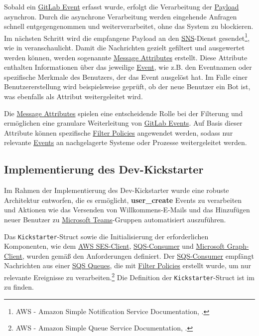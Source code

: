 Sobald ein \hyperlink{GitLabEvent}{\textcolor{AOBlau}{GitLab Event}} erfasst wurde, erfolgt die Verarbeitung der \hyperlink{Payload}{\textcolor{AOBlau}{Payload}} asynchron. Durch die asynchrone Verarbeitung werden eingehende Anfragen schnell entgegengenommen und weiterverarbeitet, ohne das System zu blockieren. Im nächsten Schritt wird die empfangene Payload an den \hyperlink{SNS}{\textcolor{AOBlau}{SNS}}-Dienst gesendet\footnote{AWS - Amazon Simple Notification Service Documentation, \cite{aws2023sns}.}, wie in  veranschaulicht. Damit die Nachrichten gezielt gefiltert und ausgewertet werden können, werden sogenannte \hyperlink{MessageAttributes}{\textcolor{AOBlau}{Message Attributes}} erstellt. Diese Attribute enthalten Informationen über das jeweilige \hyperlink{GitLabEvent}{\textcolor{AOBlau}{Event}}, wie z.B. den Eventnamen oder spezifische Merkmale des Benutzers, der das Event ausgelöst hat. Im Falle einer Benutzererstellung wird beispielsweise geprüft, ob der neue Benutzer ein Bot ist, was ebenfalls als Attribut weitergeleitet wird.

Die \hyperlink{MessageAttributes}{\textcolor{AOBlau}{Message Attributes}} spielen eine entscheidende Rolle bei der Filterung und ermöglichen eine granulare Weiterleitung von \hyperlink{GitLabEvent}{\textcolor{AOBlau}{GitLab Events}}. Auf Basis dieser Attribute können spezifische \hyperlink{FilterPolicies}{\textcolor{AOBlau}{Filter Policies}} angewendet werden, sodass nur relevante \hyperlink{Events}{\textcolor{AOBlau}{Events}} an nachgelagerte Systeme oder Prozesse weitergeleitet werden.

\subsection{Implementierung des Dev-Kickstarter}
\label{sec:ImplementierungBenutzeroberflaeche}

Im Rahmen der Implementierung des Dev-Kickstarter wurde eine robuste Architektur entworfen, die es ermöglicht, \textbf{user\_create} Events zu verarbeiten und Aktionen wie das Versenden von Willkommens-E-Mails und das Hinzufügen neuer Benutzer zu \hyperlink{MicrosoftTeams}{\textcolor{AOBlau}{Microsoft Teams}}-Gruppen automatisiert auszuführen.

Das \texttt{Kickstarter}-Struct sowie die Initialisierung der erforderlichen Komponenten, wie dem \hyperlink{AWSSESClient}{\textcolor{AOBlau}{AWS SES-Client}}, \hyperlink{SQSConsumer}{\textcolor{AOBlau}{SQS-Consumer}} und \hyperlink{GraphClient}{\textcolor{AOBlau}{Microsoft Graph-Client}}, wurden gemäß den Anforderungen definiert. Der \hyperlink{SQSConsumer}{\textcolor{AOBlau}{SQS-Consumer}} empfängt Nachrichten aus einer \hyperlink{SQS}{\textcolor{AOBlau}{SQS Queues}}, die mit \hyperlink{FilterPolicies}{\textcolor{AOBlau}{Filter Policies}} erstellt wurde, um nur relevante Ereignisse zu verarbeiten.\footnote{AWS - Amazon Simple Queue Service Documentation, \cite{aws2023sqs}.} Die Definition der \texttt{Kickstarter}-Struct ist im  zu finden.

